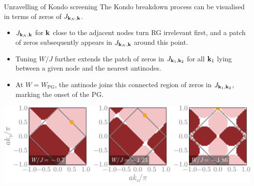 \documentclass[10pt,aspectratio=169]{beamer}
\begin{document}
\begin{frame}{Unravelling of Kondo screening}
	The Kondo breakdown process can be visualised in terms of \alert{zeros} of $J_{{\bf k}_N, {\bf k}}$.
\begin{itemize}[<+->]
	\item $J_{{\bf k}_N, {\bf k}}$ for ${\bf k}$ close to the \alert{adjacent nodes} turn RG irrelevant first, and a patch of zeros subsequently appears in $J_{{\bf k}_N, {\bf k}}$ around this point. 
	\item Tuning $W/J$ further extends the patch of zeros in $J_{{\bf k}_1, {\bf k}_2}$ for all ${\bf k}_{1}$ lying between a given node and the nearest antinodes. 
	\item At $W=W_{\text{PG}}$, the \alert{antinode} joins this connected region of zeros in $J_{{\bf k}_1, {\bf k}_2}$, marking the onset of the PG.
\end{itemize}

\begin{center}
    \includegraphics[width=0.8\linewidth]{zerosFlow.pdf}
\end{center}

\end{frame}
\end{document}
